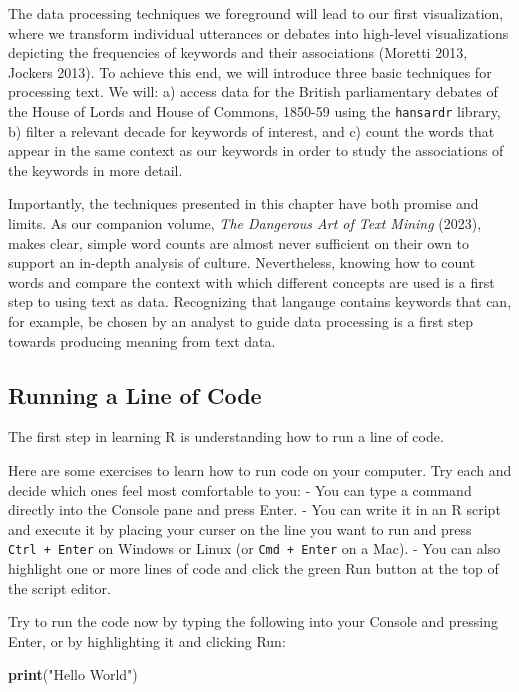 \documentclass[
]{article}
\newenvironment{Shaded}{\begin{snugshade}}{\end{snugshade}}
\newcommand{\FunctionTok}[1]{\textcolor[rgb]{0.13,0.29,0.53}{\textbf{#1}}}
\newcommand{\NormalTok}[1]{#1}
\newcommand{\StringTok}[1]{\textcolor[rgb]{0.31,0.60,0.02}{#1}}
\begin{document}
The data processing techniques we foreground will lead to our first
visualization, where we transform individual utterances or debates into
high-level visualizations depicting the frequencies of keywords and
their associations (Moretti 2013, Jockers 2013). To achieve this end, we
will introduce three basic techniques for processing text. We will: a)
access data for the British parliamentary debates of the House of Lords
and House of Commons, 1850-59 using the \texttt{hansardr} library, b)
filter a relevant decade for keywords of interest, and c) count the
words that appear in the same context as our keywords in order to study
the associations of the keywords in more detail.

Importantly, the techniques presented in this chapter have both promise
and limits. As our companion volume, \emph{The Dangerous Art of Text
Mining} (2023), makes clear, simple word counts are almost never
sufficient on their own to support an in-depth analysis of culture.
Nevertheless, knowing how to count words and compare the context with
which different concepts are used is a first step to using text as data.
Recognizing that langauge contains keywords that can, for example, be
chosen by an analyst to guide data processing is a first step towards
producing meaning from text data.

\subsection{Running a Line of Code}\label{running-a-line-of-code}

The first step in learning R is understanding how to run a line of code.

Here are some exercises to learn how to run code on your computer. Try
each and decide which ones feel most comfortable to you: - You can type
a command directly into the Console pane and press Enter. - You can
write it in an R script and execute it by placing your curser on the
line you want to run and press \texttt{Ctrl\ +\ Enter} on Windows or
Linux (or \texttt{Cmd\ +\ Enter} on a Mac). - You can also highlight one
or more lines of code and click the green Run button at the top of the
script editor.

Try to run the code now by typing the following into your Console and
pressing Enter, or by highlighting it and clicking Run:

\begin{Shaded}
\begin{Highlighting}[]
\FunctionTok{print}\NormalTok{(}\StringTok{"Hello World"}\NormalTok{)}
\end{Highlighting}
\end{Shaded}
\end{document}
